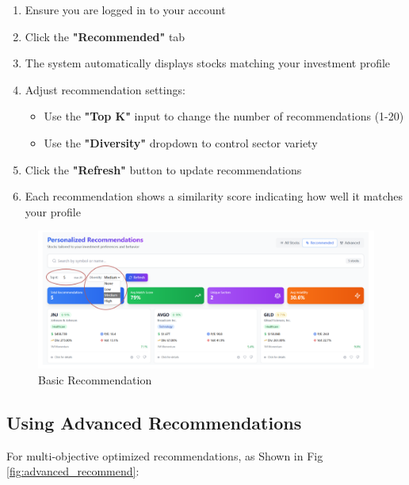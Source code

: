 \begin{enumerate}
    \item Ensure you are logged in to your account
    \item Click the \textbf{"Recommended"} tab
    \item The system automatically displays stocks matching your investment profile
    \item Adjust recommendation settings:
    \begin{itemize}
        \item Use the \textbf{"Top K"} input to change the number of recommendations (1-20)
        \item Use the \textbf{"Diversity"} dropdown to control sector variety
    \end{itemize}
    \item Click the \textbf{"Refresh"} button to update recommendations
    \item Each recommendation shows a similarity score indicating how well it matches your profile
\end{enumerate}

\begin{figure}[H]
    \centering
    \includegraphics[width=1\linewidth]{images/stock_recommend/user_guide/basic_recommend.png}
    \caption{Basic Recommendation}
    \label{fig:basic_recommend}
\end{figure}


\subsection{Using Advanced Recommendations}
For multi-objective optimized recommendations, as Shown in Fig \ref{fig:advanced_recommend}:

